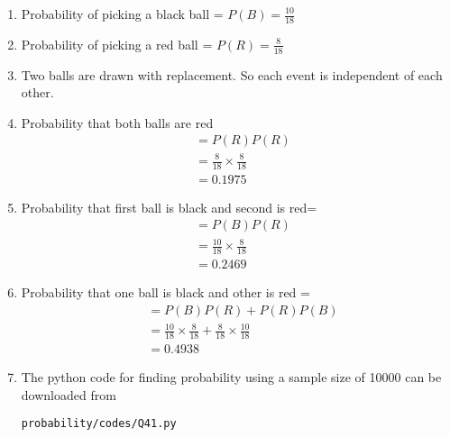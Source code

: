 \renewcommand{\theequation}{\theenumi}
\begin{enumerate}[label=\thesection.\arabic*.,ref=\thesection.\theenumi]
\item Probability of picking a black ball = $P(B) = \frac{10}{18}$ 
\item Probability of picking a red ball = $P(R) = \frac{8}{18}$
\item Two balls are drawn with replacement. So each event is independent of each other. 
\item Probability that both balls are red 
\begin{align}
&= P(R)P(R) \\
&= \frac{8}{18}\times\frac{8}{18}\\
&= 0.1975
\end{align}
\item Probability that first ball is black and second is red=
\begin{align}
&= P(B)P(R)\\
&= \frac{10}{18}\times\frac{8}{18}\\
&= 0.2469
\end{align}
\item Probability that one ball is black and other is red =
\begin{align}
&= P(B)P(R) + P(R)P(B)\\
&= \frac{10}{18}\times\frac{8}{18} + \frac{8}{18}\times\frac{10}{18}\\
&= 0.4938
\end{align}
\item The python code for finding probability using a sample size of 10000 can be downloaded from
\begin{lstlisting}
probability/codes/Q41.py
\end{lstlisting}
\end{enumerate}
